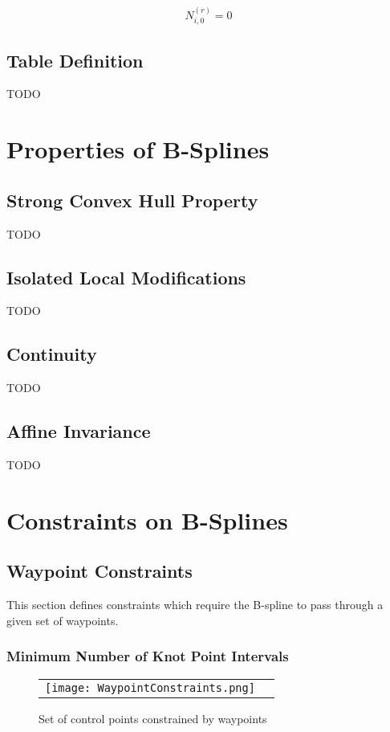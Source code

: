 \documentclass{article}
\begin{document}
  \begin{equation}
      N_{i,0}^{(r)} = 0
  \end{equation}
  
\subsection{Table Definition}
    TODO 
  
\section{Properties of B-Splines}
    
    \subsection{Strong Convex Hull Property}
    TODO
    
    \subsection{Isolated Local Modifications}
    TODO
    
    \subsection{Continuity}
    TODO
    
    \subsection{Affine Invariance}
    TODO
    
\section{Constraints on B-Splines}

\subsection{Waypoint Constraints}

This section defines constraints which require the B-spline to pass through a given set of waypoints.

\subsubsection{Minimum Number of Knot Point Intervals} \label{Minimum Number of Knot Point Intervals}

\begin{figure}[h]
\begin{tabular}{ll}
\texttt{[image: WaypointConstraints.png]}
\end{tabular}
\caption{Set of control points constrained by waypoints}
\label{Fig:WaypointConstraints.png}
\end{figure}
\end{document}
